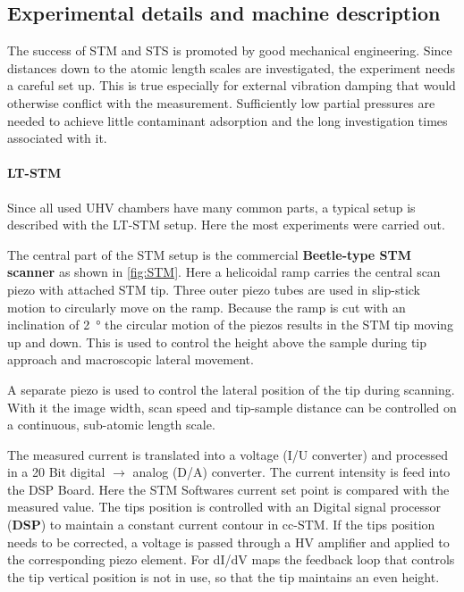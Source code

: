 \subsection{Experimental details and machine description}
The success of STM and STS is promoted by good mechanical engineering. Since distances down to the atomic length scales are investigated, the experiment needs a careful set up. This is true especially for external vibration damping that would otherwise conflict with the measurement. Sufficiently low partial pressures are needed to achieve little contaminant adsorption and the long investigation times associated with it.

\paragraph{LT-STM}
Since all used UHV chambers have many common parts, a typical setup is described with the LT-STM setup. Here the most experiments were carried out.

The central part of the STM setup is the commercial \textbf{Beetle-type STM scanner} \cite{zoephel_aufbau_2000} as shown in \autoref{fig:STM}. Here a helicoidal ramp carries the central scan piezo with attached STM tip. Three outer piezo tubes are used in slip-stick motion to circularly move on the ramp. Because the ramp is cut with an inclination of \SI{2}{\degree} the circular motion of the piezos results in the STM tip moving up and down. This is used to control the height above the sample during tip approach and macroscopic lateral movement.

A separate piezo is used to control the lateral position of the tip during scanning. With it the image width, scan speed and tip-sample distance can be controlled on a continuous, sub-atomic length scale.

The measured current is translated into a voltage (I/U converter) and processed in a 20 Bit digital $\rightarrow$ analog (D/A) converter. The current intensity is feed into the DSP Board. Here the STM Softwares current set point is compared with the measured value. The tips position is controlled with an Digital signal processor (\textbf{DSP}) to maintain a constant current contour in cc-STM. If the tips position needs to be corrected, a voltage is passed through a HV amplifier and applied to the corresponding piezo element. For dI/dV maps the feedback loop that controls the tip vertical position is not in use, so that the tip maintains an even height. 

